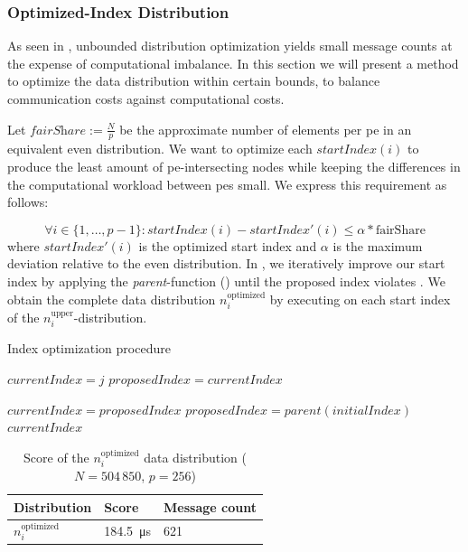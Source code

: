 \subsubsection{Optimized-Index Distribution}
As seen in , unbounded distribution optimization yields small message counts at the expense of computational imbalance.
In this section we will present a method to optimize the data distribution within certain bounds, to balance communication costs against computational costs.

Let $\textit{fairShare} := \tfrac{N}{p}$ be the approximate number of elements per \gls{pe} in an equivalent even distribution.
We want to optimize each $\textit{startIndex}(i)$ to produce the least amount of \gls{pe}-intersecting nodes while keeping the differences in the computational workload between \glspl{pe} small.
We express this requirement as follows:

\begin{equation}
\label{eq:optimizedIndexBounds}
\forall i \in \{1, \ldots, p - 1\}: \textit{startIndex}(i) - \textit{startIndex}'(i) \leq \alpha * \textrm{fairShare}
\end{equation}
where $\textit{startIndex}'(i)$ is the optimized start index and $\alpha$ is the maximum deviation relative to the even distribution.
In , we iteratively improve our start index by applying the \textit{parent}-function () until the proposed index violates .
We obtain the complete data distribution $n_i^\textrm{optimized}$ by executing  on each start index of the $n_i^\textrm{upper}$-distribution.

\begin{algorithm}
\caption{Index optimization procedure}\label{algo:optimizeIndex}
\DontPrintSemicolon
\SetAlgoLined
{}

$currentIndex = j$\;
$proposedIndex = currentIndex$\;

 {
	$currentIndex = proposedIndex$\;
	$proposedIndex = parent(initialIndex)$\;
}
\Return $currentIndex$\;
\end{algorithm}


\begin{table}
\centering
\begin{tabular}{l|l|l}
Distribution & Score & Message count \\
\hline
$n_i^\textrm{optimized}$ & \SI{184.5}{\micro\second} & 621
\end{tabular}
\caption{Score of the $n_i^\textrm{optimized}$ data distribution ($N = 504\,850$, $p=256$)}
\label{table:Power2DistributionScore}
\end{table}

